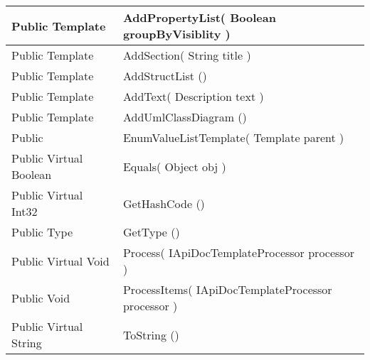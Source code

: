 \documentclass[11pt, oneside, a4paper]{book}
\begin{document}
\begin{center}
\begin{tabular}{| p{3cm} | p{12cm} | }
 Public  Template &  AddPropertyList(\hypertarget{SoftwareEngineeringTools.{}Documentation.{}EnumValueListTemplate.{}AddPropertyList\_Boolean}{} Boolean  groupByVisiblity  )\\
\hline
 Public  Template &  AddSection(\hypertarget{SoftwareEngineeringTools.{}Documentation.{}EnumValueListTemplate.{}AddSection\_String}{} String  title  )\\
\hline
 Public  Template &  AddStructList ()\hypertarget{SoftwareEngineeringTools.{}Documentation.{}EnumValueListTemplate.{}AddStructList}{}\\
\hline
 Public  Template &  AddText(\hypertarget{SoftwareEngineeringTools.{}Documentation.{}EnumValueListTemplate.{}AddText\_Description}{} Description  text  )\\
\hline
 Public  Template &  AddUmlClassDiagram ()\hypertarget{SoftwareEngineeringTools.{}Documentation.{}EnumValueListTemplate.{}AddUmlClassDiagram}{}\\
\hline
 Public  &  EnumValueListTemplate(\hypertarget{SoftwareEngineeringTools.{}Documentation.{}EnumValueListTemplate.{}EnumValueListTemplate\_Template}{} Template  parent  )\\
\hline
 Public  Virtual  Boolean &  Equals(\hypertarget{SoftwareEngineeringTools.{}Documentation.{}EnumValueListTemplate.{}Equals\_Object}{} Object  obj  )\\
\hline
 Public  Virtual  Int32 &  GetHashCode ()\hypertarget{SoftwareEngineeringTools.{}Documentation.{}EnumValueListTemplate.{}GetHashCode}{}\\
\hline
 Public  Type &  GetType ()\hypertarget{SoftwareEngineeringTools.{}Documentation.{}EnumValueListTemplate.{}GetType}{}\\
\hline
 Public  Virtual  Void &  Process(\hypertarget{SoftwareEngineeringTools.{}Documentation.{}EnumValueListTemplate.{}Process\_IApiDocTemplateProcessor}{} IApiDocTemplateProcessor  processor  )\\
\hline
 Public  Void &  ProcessItems(\hypertarget{SoftwareEngineeringTools.{}Documentation.{}EnumValueListTemplate.{}ProcessItems\_IApiDocTemplateProcessor}{} IApiDocTemplateProcessor  processor  )\\
\hline
 Public  Virtual  String &  ToString ()\hypertarget{SoftwareEngineeringTools.{}Documentation.{}EnumValueListTemplate.{}ToString}{}\\
\hline
\end{tabular}
\end{center}
 
\end{document}

